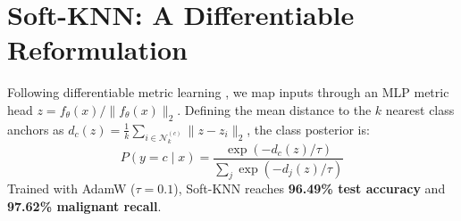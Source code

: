 \documentclass[10pt,twocolumn,letterpaper]{article}
\begin{document}
\section{Soft-KNN: A Differentiable Reformulation}
Following differentiable metric learning \cite{goldberger2004,weinberger2009}, we map inputs through an MLP metric head $z = f_\theta(x) / \|f_\theta(x)\|_2$. Defining the mean distance to the $k$ nearest class anchors as $d_c(z) = \frac{1}{k} \sum_{i \in \mathcal{N}_k^{(c)}} \|z - z_i\|_2$, the class posterior is:
\begin{equation}
P(y=c \mid x) = \frac{\exp(-d_c(z) / \tau)}{\sum_j \exp(-d_j(z) / \tau)}
\end{equation}
Trained with AdamW ($\tau=0.1$), Soft-KNN reaches \textbf{96.49\% test accuracy} and \textbf{97.62\% malignant recall}.
\end{document}
